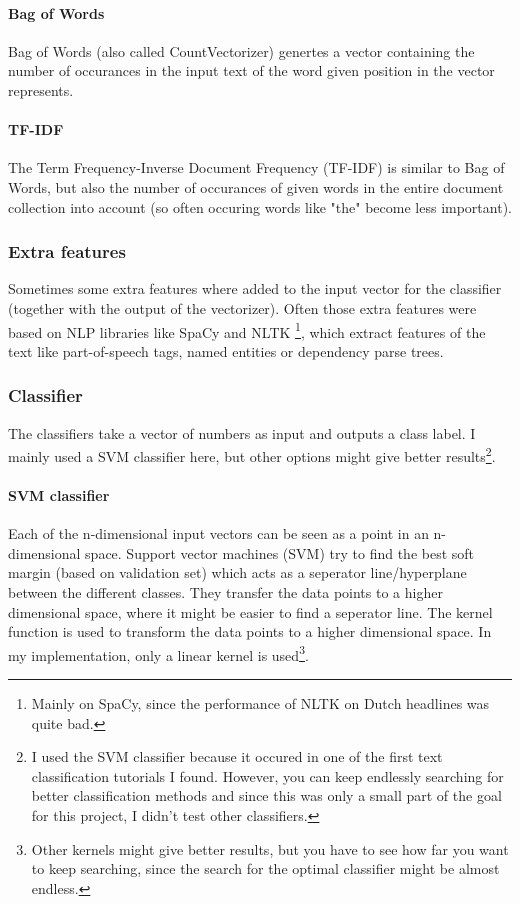 \documentclass{article}
\begin{document}
\paragraph{Bag of Words}
Bag of Words (also called CountVectorizer) genertes a vector containing the number of occurances in the input text of the word given position in the vector represents. \cite{patel2021fake}

\paragraph{TF-IDF}
The Term Frequency-Inverse Document Frequency (TF-IDF) is similar to Bag of Words, but also the number of occurances of given words in the entire document collection into account (so often occuring words like "the" become less important). \cite{patel2021fake}

\subsubsection{Extra features}
Sometimes some extra features where added to the input vector for the classifier (together with the output of the vectorizer). Often those extra features were based on NLP libraries like SpaCy and NLTK \footnote{Mainly on SpaCy, since the performance of NLTK on Dutch headlines was quite bad.}, which extract features of the text like part-of-speech tags, named entities or dependency parse trees. \cite{vasiliev2020natural}

\subsubsection{Classifier}
The classifiers take a vector of numbers as input and outputs a class label. I mainly used a SVM classifier here, but other options might give better results\footnote{I used the SVM classifier because it occured in one of the first text classification tutorials I found. However, you can keep endlessly searching for better classification methods and since this was only a small part of the goal for this project, I didn't test other classifiers.}. %

\paragraph{SVM classifier}
 Each of the n-dimensional input vectors can be seen as a point in an n-dimensional space. Support vector machines (SVM) try to find the best soft margin (based on validation set) which acts as a seperator line/hyperplane between the different classes. They transfer the data points to a higher dimensional space, where it might be easier to find a seperator line. The kernel function is used to transform the data points to a higher dimensional space. In my implementation, only a linear kernel is used\footnote{Other kernels might give better results, but you have to see how far you want to keep searching, since the search for the optimal classifier might be almost endless.}. \cite{gholami2017support}
\end{document}
